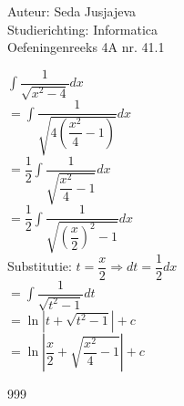\documentclass[a4paper]{article}
\newcommand{\integral}{\displaystyle\int}
\begin{document}
\noindent \large Auteur: Seda Jusjajeva\\
\noindent \large Studierichting: Informatica\\
\noindent \large Oefeningenreeks 4A nr. 41.1\\

\medskip

\normalsize

$\integral\dfrac{1}{\sqrt{x^2 - 4}}dx$ \\

$= \integral\dfrac{1}{\sqrt{4\left(\dfrac{x^2}{4} - 1\right)}}dx$ \\

$= \dfrac{1}{2}\integral\dfrac{1}{\sqrt{\dfrac{x^2}{4} - 1}}dx$ \\

$= \dfrac{1}{2}\integral\dfrac{1}{\sqrt{\left(\dfrac{x}{2}\right)^2 - 1}}dx$ \\

Substitutie: $t = \dfrac{x}{2} \Rightarrow dt = \dfrac{1}{2}dx$ \\

$= \integral\dfrac{1}{\sqrt{t^2 - 1}}dt$ \\

$= \ln|t + \sqrt{t^2 - 1}| + c$ \\

$= \ln\left|\dfrac{x}{2} + \sqrt{\dfrac{x^2}{4} - 1}\right| + c$ \\



\begin{thebibliography}{999}
\end{thebibliography}
\end{document}

